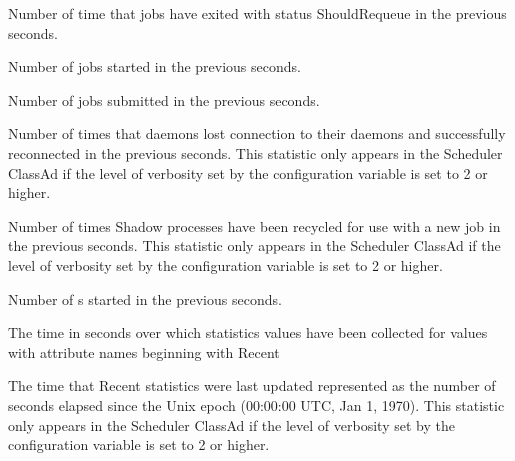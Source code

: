 \begin{description}
\item[\AdAttr{RecentJobsShouldRequeue}:] Number of time that jobs have exited with status ShouldRequeue
  in the previous  seconds.

\item[\AdAttr{RecentJobsStarted}:] Number of jobs started
  in the previous  seconds.

\item[\AdAttr{RecentJobsSubmitted}:] Number of jobs submitted
  in the previous  seconds.

\item[\AdAttr{RecentShadowsReconnections}:] Number of times that   daemons lost 
  connection to their  daemons and successfully reconnected
  in the previous  seconds.
  This statistic only appears in the Scheduler ClassAd if the level of
  verbosity set by the configuration variable 
  is set to 2 or higher.
  
\item[\AdAttr{RecentShadowsRecycled}:] Number of times Shadow processes have been 
  recycled for use with a new job
  in the previous  seconds.
  This statistic only appears in the Scheduler ClassAd if the level of
  verbosity set by the configuration variable 
  is set to 2 or higher.

\item[\AdAttr{RecentShadowsStarted}:] Number of s started
  in the previous  seconds.

\item[\AdAttr{RecentStatsLifetime}:] The time in seconds over which statistics values have been collected 
  for values with attribute names beginning with Recent

\item[\AdAttr{RecentStatsTickTime}:] The time that Recent statistics were last updated
  represented as the number of seconds elapsed since
    the Unix epoch (00:00:00 UTC, Jan 1, 1970).
  This statistic only appears in the Scheduler ClassAd if the level of
  verbosity set by the configuration variable 
  is set to 2 or higher.


\end{description}
